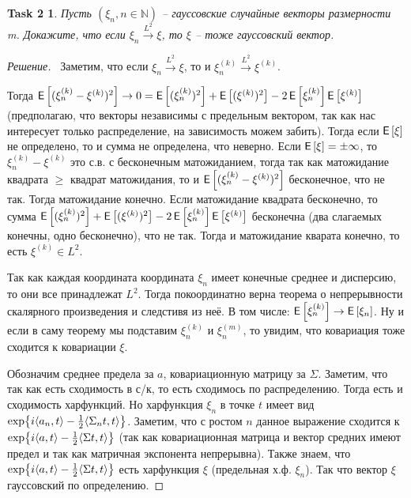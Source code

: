 \documentclass[12pt,a4paper]{extarticle}
\newtheorem*{task2}{Task 2}
\newcommand{\N}{\mathbb{N}}
\newcommand{\ps}{\xrightarrow{L^2}}
\newcommand{\ra}{\rightarrow}
\begin{document}
\begin{task2}
	Пусть $(\xi_n, n \in \N)$ -- гауссовские случайные векторы размерности m. Докажите, что если $\xi_n \ps \xi$, то $\xi$ -- тоже гауссовский вектор.
\end{task2}
\begin{proof}[Решение]
	\
	Заметим, что если $\xi_n \ps \xi$, то и $\xi_n^{(k)} \ps \xi^{(k)}$. 
	
	Тогда $\E{(\xi_n^{(k)} - \xi^{(k)})^2} \ra 0 = \E{(\xi_n^{(k)})^2} + \E{(\xi^{(k)})^2} - 2 \E{\xi_n^{(k)}} \E{\xi^{(k)}}$ (предполагаю, что векторы независимы с предельным вектором, так как нас интересует только распределение, на зависимость можем забить). Тогда если $\E{\xi}$ не определено, то и сумма не определена, что неверно. Если $\E{\xi} = \pm \infty$, то $\xi_n^{(k)} - \xi^{(k)}$ это с.в. с бесконечным матожиданием, тогда так как матожидание квадрата $\geq$ квадрат матожидания, то и $\E{(\xi_n^{(k)} - \xi^{(k)})^2}$ бесконечное, что не так. Тогда матожидание конечно. Если матожидание квадрата бесконечно, то сумма $\E{(\xi_n^{(k)})^2} + \E{(\xi^{(k)})^2} - 2 \E{\xi_n^{(k)}} \E{\xi^{(k)}}$ бесконечна (два слагаемых конечны, одно бесконечно), что не так. Тогда и матожидание кварата конечно, то есть $\xi^{(k)} \in L^2$.
	
	Так как каждая координата координата $\xi_n$ имеет конечные среднее и дисперсию, то они все принадлежат $L^2$. Тогда покоординатно верна теорема о непрерывности скалярного произведения и следстивя из неё. В том числе: $\E{\xi_n^{(k)}} \ra \E{\xi_n}$. Ну и если в саму теорему мы подставим $\xi_n^{(k)}$ и $\xi_n^{(m)}$, то увидим, что ковариация тоже сходится к ковариации $\xi$. 
	
	Обозначим среднее предела за $a$, ковариационную матрицу за $\Sigma$. Заметим, что так как есть сходимость в с/к, то есть сходимось по распределению. Тогда есть и сходимость харфункций. Но харфункция $\xi_n$ в точке $t$ имеет вид $\exp{i \langle a_n, t \rangle - {1 \over 2} \langle \Sigma_n t, t \rangle}$. Заметим, что с ростом $n$ данное выражение сходится к $\exp{i \langle a, t \rangle - {1 \over 2} \langle \Sigma t, t \rangle}$ (так как ковариационная матрица и вектор средних имеют предел и так как матричная экспонента непрерывна). Также знаем, что $\exp{i \langle a, t \rangle - {1 \over 2} \langle \Sigma t, t \rangle}$ есть харфункция $\xi$ (предельная х.ф. $\xi_n$). Так что вектор $\xi$ гауссовский по определению. 
	
	
\end{proof}
\end{document}
